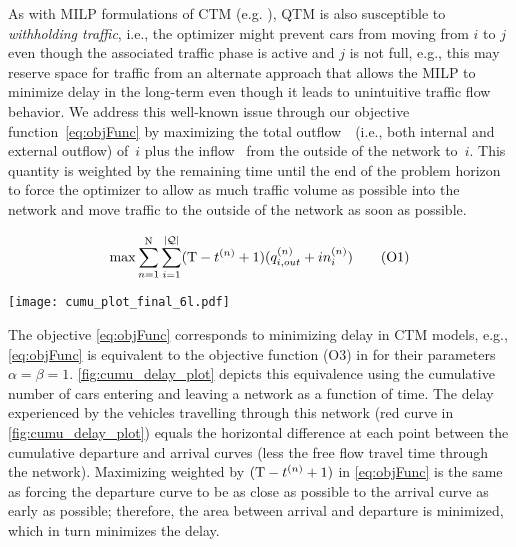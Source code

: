 As with MILP formulations of CTM (e.g. ),
QTM is also susceptible to \emph{withholding traffic}, i.e., the
optimizer might prevent cars from moving from $i$ to $j$ even though the
associated traffic phase is active and $j$ is not full, e.g., this may
reserve space for traffic from an alternate approach that allows the MILP
to minimize delay in the long-term even though it leads to unintuitive traffic
flow behavior.
%
We address this well-known issue through our objective function~\eqref{eq:objFunc} by
maximizing the total outflow~~(i.e., both internal and external outflow)
of~$i$ plus the inflow~ from the outside of the network to~$i$.
%
This quantity is weighted by the remaining time until the end of the problem
horizon \TMAX to force the optimizer to allow as much traffic volume as possible
into the network and move traffic to the outside of the network as soon as
possible.


\begin{equation}
\max 
 \sum_{n=1}^{\mathrm{N}} \sum_{i=1}^{|\mathcal{\mathcal{Q}}|} (\mathrm{T} - t^{(n)} + 1) (q_{i,out}^{(n)} + in_{i}^{(n)})
\tag{O1}\label{eq:objFunc}
\end{equation}


\begin{figure*}[t!]
\centering
\texttt{[image: cumu\_plot\_final\_6l.pdf]}
\caption{Cumulative arrival (blue) and departure (green) curves, and the
resulting delay curve (red). The departure curve is maximized by the objective
function \eqref{eq:objFunc}, which has the same effect as minimizing the area
under the delay curve.}
\label{fig:cumu_delay_plot}
\end{figure*}


The objective \eqref{eq:objFunc} corresponds to minimizing delay in CTM models,
e.g., \eqref{eq:objFunc} is equivalent to the objective function (O3) in
 for their parameters $\alpha = \beta = 1$.
%
\cref{fig:cumu_delay_plot} depicts this equivalence using the cumulative number
of cars entering and leaving a network as a function of time.
%
The delay experienced by the vehicles travelling through this network (red curve
in \cref{fig:cumu_delay_plot}) equals the horizontal difference at each point
between the cumulative departure and arrival curves (less the free flow travel
time through the network).
%
Maximizing  weighted by $(\mathrm{T} - t^{(n)} +1)$ in \eqref{eq:objFunc} is the
same as forcing the departure curve to be as close as possible to the arrival
curve as early as possible; therefore, the area between arrival and departure is
minimized, which in turn minimizes the delay.



